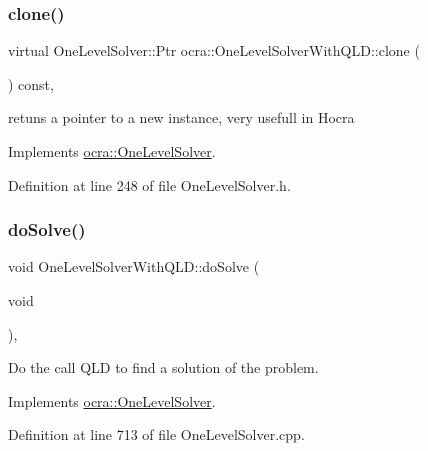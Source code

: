 \subsubsection{\texorpdfstring{clone()}{clone()}}
{\footnotesize\ttfamily virtual One\+Level\+Solver\+::\+Ptr ocra\+::\+One\+Level\+Solver\+With\+Q\+L\+D\+::clone (\begin{DoxyParamCaption}{ }\end{DoxyParamCaption}) const\hspace{0.3cm}{\ttfamily [inline]}, {\ttfamily [virtual]}}

retuns a pointer to a new instance, very usefull in Hocra 

Implements \hyperlink{classocra_1_1OneLevelSolver_a08ecd92d4295e03aa03075a71d481f48}{ocra\+::\+One\+Level\+Solver}.



Definition at line 248 of file One\+Level\+Solver.\+h.

\hypertarget{classocra_1_1OneLevelSolverWithQLD_ac7cce5bd375142ca0c74cd71300b15a5}{}\label{classocra_1_1OneLevelSolverWithQLD_ac7cce5bd375142ca0c74cd71300b15a5} 
\subsubsection{\texorpdfstring{do\+Solve()}{doSolve()}}
{\footnotesize\ttfamily void One\+Level\+Solver\+With\+Q\+L\+D\+::do\+Solve (\begin{DoxyParamCaption}\item[{void}]{ }\end{DoxyParamCaption})\hspace{0.3cm}{\ttfamily [protected]}, {\ttfamily [virtual]}}

Do the call Q\+LD to find a solution of the problem. 

Implements \hyperlink{classocra_1_1OneLevelSolver_aeb4fb349df382921c5c0064d7a05c48b}{ocra\+::\+One\+Level\+Solver}.



Definition at line 713 of file One\+Level\+Solver.\+cpp.

\hypertarget{classocra_1_1OneLevelSolverWithQLD_abc304c0e5f9234ca4230f7b67b02a0c0}{}\label{classocra_1_1OneLevelSolverWithQLD_abc304c0e5f9234ca4230f7b67b02a0c0} 
